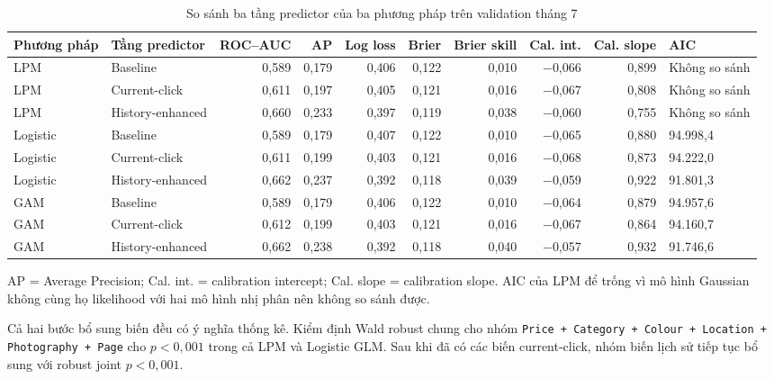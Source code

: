 \begin{table}[H]
\centering
\caption{So sánh ba tầng predictor của ba phương pháp trên validation tháng 7}
\label{tab:model-compare}
\footnotesize
\setlength{\tabcolsep}{4pt}
\begin{tabular}{llrrrrrrrl}
\toprule
\textbf{Phương pháp} & \textbf{Tầng predictor} & \textbf{ROC--AUC}
& \textbf{AP} & \textbf{Log loss} & \textbf{Brier} & \textbf{Brier skill}
& \textbf{Cal. int.} & \textbf{Cal. slope} & \textbf{AIC} \\
\midrule
LPM      & Baseline         & 0,589 & 0,179 & 0,406 & 0,122 & 0,010 & $-$0,066 & 0,899 & Không so sánh \\
LPM      & Current-click    & 0,611 & 0,197 & 0,405 & 0,121 & 0,016 & $-$0,067 & 0,808 & Không so sánh \\
LPM      & History-enhanced & 0,660 & 0,233 & 0,397 & 0,119 & 0,038 & $-$0,060 & 0,755 & Không so sánh \\
\midrule
Logistic & Baseline         & 0,589 & 0,179 & 0,407 & 0,122 & 0,010 & $-$0,065 & 0,880 & 94.998,4 \\
Logistic & Current-click    & 0,611 & 0,199 & 0,403 & 0,121 & 0,016 & $-$0,068 & 0,873 & 94.222,0 \\
Logistic & History-enhanced & 0,662 & 0,237 & 0,392 & 0,118 & 0,039 & $-$0,059 & 0,922 & 91.801,3 \\
\midrule
GAM      & Baseline         & 0,589 & 0,179 & 0,406 & 0,122 & 0,010 & $-$0,064 & 0,879 & 94.957,6 \\
GAM      & Current-click    & 0,612 & 0,199 & 0,403 & 0,121 & 0,016 & $-$0,067 & 0,864 & 94.160,7 \\
GAM      & History-enhanced & 0,662 & 0,238 & 0,392 & 0,118 & 0,040 & $-$0,057 & 0,932 & 91.746,6 \\
\bottomrule
\end{tabular}

\vspace{4pt}
{\footnotesize AP = Average Precision; Cal. int. = calibration intercept;
Cal. slope = calibration slope. AIC của LPM để trống vì mô hình Gaussian không
cùng họ likelihood với hai mô hình nhị phân nên không so sánh được.}
\end{table}

Cả hai bước bổ sung biến đều có ý nghĩa thống kê. Kiểm định Wald robust chung cho
nhóm \texttt{Price + Category + Colour + Location + Photography + Page} cho
$p < 0{,}001$ trong cả LPM và Logistic GLM. Sau khi đã có các biến current-click,
nhóm biến lịch sử tiếp tục bổ sung với robust joint $p < 0{,}001$.

